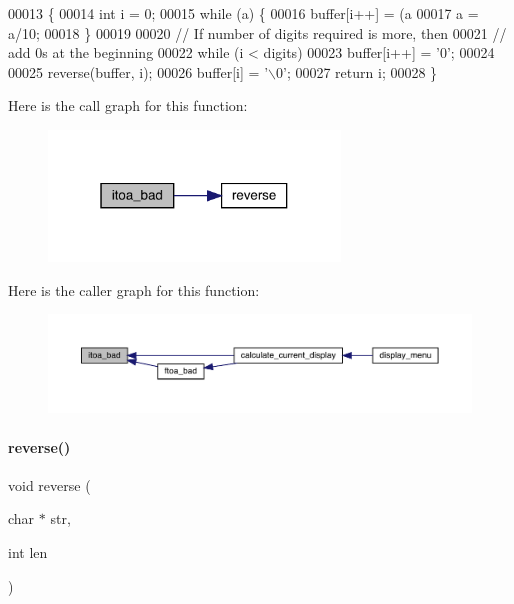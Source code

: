\begin{DoxyCode}
00013                                               \{
00014   \textcolor{keywordtype}{int} i = 0;
00015    \textcolor{keywordflow}{while} (a) \{
00016        buffer[i++] = (a%
00017        a = a/10;
00018    \}
00019 
00020    \textcolor{comment}{// If number of digits required is more, then}
00021    \textcolor{comment}{// add 0s at the beginning}
00022    \textcolor{keywordflow}{while} (i < digits)
00023        buffer[i++] = \textcolor{charliteral}{'0'};
00024 
00025    reverse(buffer, i);
00026    buffer[i] = \textcolor{charliteral}{'\(\backslash\)0'};
00027    \textcolor{keywordflow}{return} i;
00028 \}
\end{DoxyCode}
Here is the call graph for this function\+:\nopagebreak
\begin{figure}[H]
\begin{center}
\leavevmode
\includegraphics[width=220pt]{vlib_8h_a08fa7134f8b9a80eeba25f9feab22892_cgraph}
\end{center}
\end{figure}
Here is the caller graph for this function\+:\nopagebreak
\begin{figure}[H]
\begin{center}
\leavevmode
\includegraphics[width=350pt]{vlib_8h_a08fa7134f8b9a80eeba25f9feab22892_icgraph}
\end{center}
\end{figure}
\mbox{\label{vlib_8h_aad7fea725cb4b198ace1aa3df5051244}} 
\paragraph{reverse()}
{\footnotesize\ttfamily void reverse (\begin{DoxyParamCaption}\item[{char $\ast$}]{str,  }\item[{int}]{len }\end{DoxyParamCaption})}



